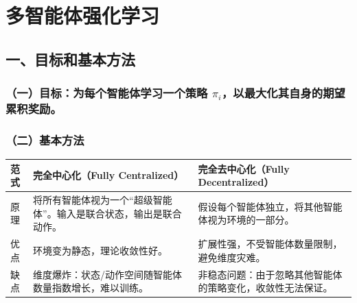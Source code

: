\setcounter{section}{3}

\hypertarget{ux591aux667aux80fdux4f53ux5f3aux5316ux5b66ux4e60}{%
\section{多智能体强化学习}\label{ux591aux667aux80fdux4f53ux5f3aux5316ux5b66ux4e60}}

\hypertarget{ux4e00ux76eeux6807ux548cux57faux672cux65b9ux6cd5}{%
\subsection{一、目标和基本方法}\label{ux4e00ux76eeux6807ux548cux57faux672cux65b9ux6cd5}}

\hypertarget{ux4e00ux76eeux6807ux4e3aux6bcfux4e2aux667aux80fdux4f53ux5b66ux4e60ux4e00ux4e2aux7b56ux7565-pi_iux4ee5ux6700ux5927ux5316ux5176ux81eaux8eabux7684ux671fux671bux7d2fux79efux5956ux52b1}{%
\subsubsection{\texorpdfstring{（一）目标：为每个智能体学习一个策略 \(\pi_i\)，以最大化其自身的期望累积奖励。}{（一）目标：为每个智能体学习一个策略 \textbackslash pi\_i，以最大化其自身的期望累积奖励。}}\label{ux4e00ux76eeux6807ux4e3aux6bcfux4e2aux667aux80fdux4f53ux5b66ux4e60ux4e00ux4e2aux7b56ux7565-pi_iux4ee5ux6700ux5927ux5316ux5176ux81eaux8eabux7684ux671fux671bux7d2fux79efux5956ux52b1}}

\hypertarget{ux4e8cux57faux672cux65b9ux6cd5}{%
\subsubsection{（二）基本方法}\label{ux4e8cux57faux672cux65b9ux6cd5}}

\begin{longtable}[]{@{}
  >{\raggedright\arraybackslash}p{}
  >{\raggedright\arraybackslash}p{}
  >{\raggedright\arraybackslash}p{}@{}}
\toprule
范式 & 完全中心化（Fully Centralized） & 完全去中心化（Fully Decentralized） \\
\midrule
\endhead
原理 & 将所有智能体视为一个``超级智能体''。输入是联合状态，输出是联合动作。 & 假设每个智能体独立，将其他智能体视为环境的一部分。 \\
优点 & 环境变为静态，理论收敛性好。 & 扩展性强，不受智能体数量限制，避免维度灾难。 \\
缺点 & 维度爆炸：状态/动作空间随智能体数量指数增长，难以训练。 & 非稳态问题：由于忽略其他智能体的策略变化，收敛性无法保证。 \\
\bottomrule
\end{longtable}

